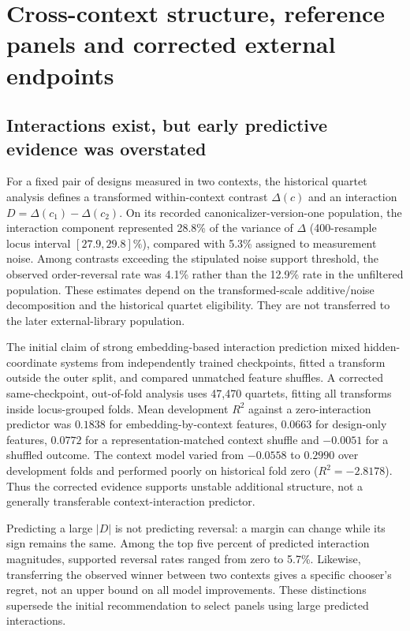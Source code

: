 \section{Cross-context structure, reference panels and corrected external endpoints}
\subsection{Interactions exist, but early predictive evidence was overstated}
For a fixed pair of designs measured in two contexts, the historical quartet analysis defines a transformed within-context contrast $\Delta(c)$ and an interaction $D=\Delta(c_1)-\Delta(c_2)$. On its recorded canonicalizer-version-one population, the interaction component represented 28.8\% of the variance of $\Delta$ (400-resample locus interval $[27.9,29.8]\%$), compared with 5.3\% assigned to measurement noise. Among contrasts exceeding the stipulated noise support threshold, the observed order-reversal rate was 4.1\% rather than the 12.9\% rate in the unfiltered population. These estimates depend on the transformed-scale additive/noise decomposition and the historical quartet eligibility. They are not transferred to the later external-library population.

The initial claim of strong embedding-based interaction prediction mixed hidden-coordinate systems from independently trained checkpoints, fitted a transform outside the outer split, and compared unmatched feature shuffles. A corrected same-checkpoint, out-of-fold analysis uses 47,470 quartets, fitting all transforms inside locus-grouped folds. Mean development $R^2$ against a zero-interaction predictor was $0.1838$ for embedding-by-context features, $0.0663$ for design-only features, $0.0772$ for a representation-matched context shuffle and $-0.0051$ for a shuffled outcome. The context model varied from $-0.0558$ to $0.2990$ over development folds and performed poorly on historical fold zero ($R^2=-2.8178$). Thus the corrected evidence supports unstable additional structure, not a generally transferable context-interaction predictor.

Predicting a large $|D|$ is not predicting reversal: a margin can change while its sign remains the same. Among the top five percent of predicted interaction magnitudes, supported reversal rates ranged from zero to 5.7\%. Likewise, transferring the observed winner between two contexts gives a specific chooser's regret, not an upper bound on all model improvements. These distinctions supersede the initial recommendation to select panels using large predicted interactions.

